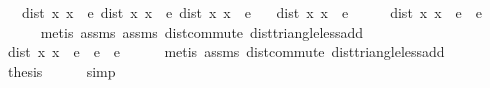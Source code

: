 \begin{isabellebody}
\ \ \ {\isachardoublequoteopen}dist\ x{}\ x{}\ {\isacharless}{\kern0pt}\ e{\isacharslash}{\kern0pt}{}{\isachardoublequoteclose}\ {\isachardoublequoteopen}dist\ x{}\ x{}\ {\isacharless}{\kern0pt}\ e{\isacharslash}{\kern0pt}{}{\isachardoublequoteclose}\ {\isachardoublequoteopen}dist\ x{}\ x{}\ {\isacharless}{\kern0pt}\ e{\isacharslash}{\kern0pt}{}{\isachardoublequoteclose}\isanewline
\ \ \ {\isachardoublequoteopen}dist\ x{}\ x{}\ {\isacharless}{\kern0pt}\ e{\isachardoublequoteclose}\isanewline
%
\isadelimproof
%
\endisadelimproof
%
\isatagproof
{}\isamarkupfalse%
\ {\isacharminus}{\kern0pt}\isanewline
\ \ \isamarkupfalse%
\ {\isachardoublequoteopen}dist\ x{}\ x{}\ {\isacharless}{\kern0pt}\ e{\isacharslash}{\kern0pt}{}\ {\isacharplus}{\kern0pt}\ e{\isacharslash}{\kern0pt}{}{\isachardoublequoteclose}\isanewline
\ \ \ \ \isamarkupfalse%
\ {\isacharparenleft}{\kern0pt}metis\ assms{\isacharparenleft}{\kern0pt}{}{\isacharparenright}{\kern0pt}\ assms{\isacharparenleft}{\kern0pt}{}{\isacharparenright}{\kern0pt}\ dist{\isacharunderscore}{\kern0pt}commute\ dist{\isacharunderscore}{\kern0pt}triangle{\isacharunderscore}{\kern0pt}less{\isacharunderscore}{\kern0pt}add{\isacharparenright}{\kern0pt}\isanewline
\ \ \isamarkupfalse%
\ \isamarkupfalse%
\ {\isachardoublequoteopen}dist\ x{}\ x{}\ {\isacharless}{\kern0pt}\ {\isacharparenleft}{\kern0pt}e{\isacharslash}{\kern0pt}{}\ {\isacharplus}{\kern0pt}\ e{\isacharslash}{\kern0pt}{}{\isacharparenright}{\kern0pt}\ {\isacharplus}{\kern0pt}\ e{\isacharslash}{\kern0pt}{}{\isachardoublequoteclose}\isanewline
\ \ \ \ \isamarkupfalse%
\ {\isacharparenleft}{\kern0pt}metis\ assms{\isacharparenleft}{\kern0pt}{}{\isacharparenright}{\kern0pt}\ dist{\isacharunderscore}{\kern0pt}commute\ dist{\isacharunderscore}{\kern0pt}triangle{\isacharunderscore}{\kern0pt}less{\isacharunderscore}{\kern0pt}add{\isacharparenright}{\kern0pt}\isanewline
\ \ \isamarkupfalse%
\ \isamarkupfalse%
\ {\isacharquery}{\kern0pt}thesis\isanewline
\ \ \ \ \isamarkupfalse%
\ simp\isanewline
{}\isamarkupfalse%
%
\endisatagproof
{\isafoldproof}%
%
\isadelimproof
\isanewline
%
\endisadelimproof
\ \ \isanewline

\end{isabellebody}
